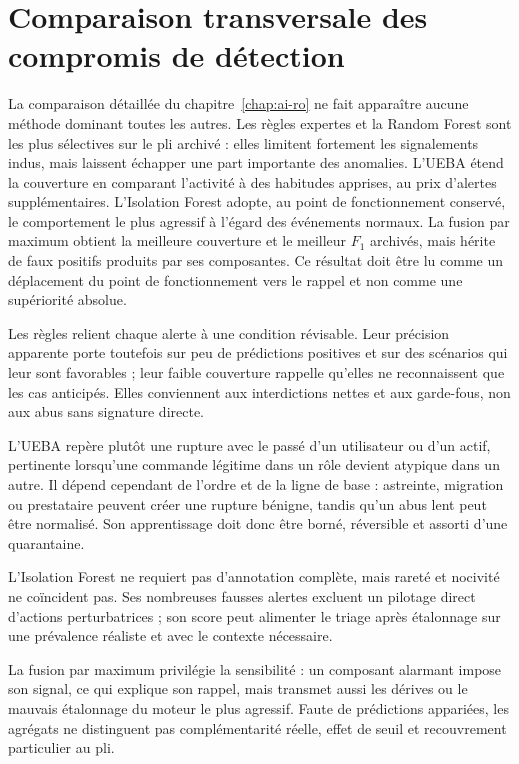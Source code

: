 \documentclass[11pt,a4paper,oneside]{report}
\theoremstyle{definition}
\theoremstyle{plain}
\begin{document}
\section{Comparaison transversale des compromis de détection}
\label{sec:validation-detection}

La comparaison détaillée du chapitre~\ref{chap:ai-ro} ne fait apparaître aucune
méthode dominant toutes les autres. Les règles expertes et la Random Forest
sont les plus sélectives sur le pli archivé : elles limitent fortement les
signalements indus, mais laissent échapper une part importante des anomalies.
L'UEBA étend la couverture en comparant l'activité à des habitudes apprises,
au prix d'alertes supplémentaires. L'Isolation Forest adopte, au point de
fonctionnement conservé, le comportement le plus agressif à l'égard des
événements normaux. La fusion par maximum obtient la meilleure couverture et
le meilleur \(F_1\) archivés, mais hérite de faux positifs produits par ses
composantes. Ce résultat doit être lu comme un déplacement du point de
fonctionnement vers le rappel et non comme une supériorité absolue.

Les règles relient chaque alerte à une condition révisable. Leur précision
apparente porte toutefois sur peu de prédictions positives et sur des scénarios
qui leur sont favorables ; leur faible couverture rappelle qu'elles ne
reconnaissent que les cas anticipés. Elles conviennent aux interdictions nettes
et aux garde-fous, non aux abus sans signature directe.

L'UEBA repère plutôt une rupture avec le passé d'un utilisateur ou d'un actif,
pertinente lorsqu'une commande légitime dans un rôle devient atypique dans un
autre. Il dépend cependant de l'ordre et de la ligne de base : astreinte,
migration ou prestataire peuvent créer une rupture bénigne, tandis qu'un abus
lent peut être normalisé. Son apprentissage doit donc être borné, réversible
et assorti d'une quarantaine.

L'Isolation Forest ne requiert pas d'annotation complète, mais rareté et
nocivité ne coïncident pas. Ses nombreuses fausses alertes excluent un pilotage
direct d'actions perturbatrices ; son score peut alimenter le triage après
étalonnage sur une prévalence réaliste et avec le contexte nécessaire.

La fusion par maximum privilégie la sensibilité : un composant alarmant impose
son signal, ce qui explique son rappel, mais transmet aussi les dérives ou le
mauvais étalonnage du moteur le plus agressif. Faute de prédictions appariées,
les agrégats ne distinguent pas complémentarité réelle, effet de seuil et
recouvrement particulier au pli.
\end{document}
